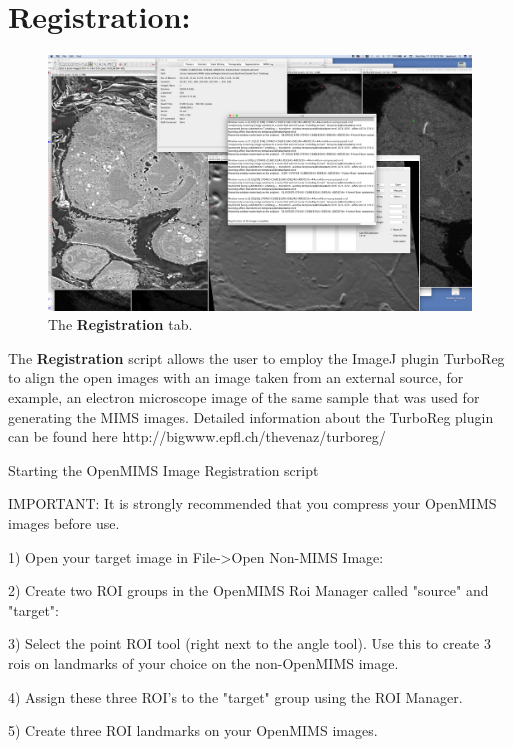 \documentclass{article}
\begin{document}
	
	
	
	
\newpage
\section*{Registration:}
	
	\begin{figure}[ht]
	\centering
	\includegraphics[scale=0.20]{snapshotRegistration.png}
	\caption{The \textbf{Registration} tab.}
	\end{figure}
	The \textbf{Registration} script allows the user to employ the ImageJ plugin TurboReg to align the open images with an image taken from an external source, for example, an electron microscope image of the same sample that was used for generating the MIMS images.   Detailed information about the TurboReg plugin can be found here http://bigwww.epfl.ch/thevenaz/turboreg/
	
	


	Starting the OpenMIMS Image Registration script


IMPORTANT: It is strongly recommended that you compress your OpenMIMS images before use.

1) Open your target image in File->Open Non-MIMS Image:

2) Create two ROI groups in the OpenMIMS Roi Manager called "source" and "target":

3) Select the point ROI tool (right next to the angle tool). Use this to create 3 rois on landmarks of your choice on the non-OpenMIMS image.

4) Assign these three ROI's to the "target" group using the ROI Manager.

5) Create three ROI landmarks on your OpenMIMS images. 
\end{document}
